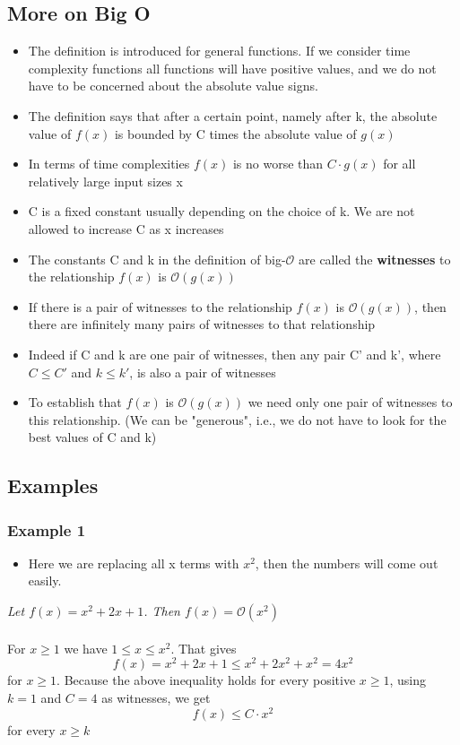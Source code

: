 \documentclass{article}[18pt]
\begin{document}
\subsection{More on Big O}
\begin{itemize}
	\item The definition is introduced for general functions. If we consider time complexity functions all functions will have positive values, and we do not have to be concerned about the absolute value signs.
	\item The definition says that after a certain point, namely after k, the absolute value of $f(x)$ is bounded by C times the absolute value of $g(x)$
	\item In terms of time complexities $f(x)$ is no worse than $C\cdot g(x)$ for all relatively large input sizes x
	\item C is a fixed constant usually depending on the choice of k. We are not allowed to increase C as x increases
	\item The constants C and k in the definition of big-$\mathcal{O}$ are called the \textbf{witnesses} to the relationship $f(x)$ is $\mathcal{O}(g(x))$
	\item If there is a pair of witnesses to the relationship $f(x)$ is $\mathcal{O}(g(x))$, then there are infinitely many pairs of witnesses to that relationship
	\item Indeed if C and k are one pair of witnesses, then any pair C' and k', where $C\leqslant C'$ and $k\leqslant k'$, is also a pair of witnesses
	\item To establish that $f(x)$ is $\mathcal{O}(g(x))$ we need only one pair of witnesses to this relationship. (We can be "generous", i.e., we do not have to look for the best values of C and k)
\end{itemize}
\subsection{Examples}
\subsubsection{Example 1}
\begin{itemize}
	\item Here we are replacing all x terms with $x^2$, then the numbers will come out easily.
\end{itemize}


\textit{Let $f(x)=x^2+2x+1$. Then $f(x)=\mathcal{O}(x^2)$ }\\
\\
For $x\geqslant 1$ we have $1\leqslant x\leqslant x^2$. That gives
$$f ( x ) = x ^ { 2 } + 2 x + 1 \leq x ^ { 2 } + 2 x ^ { 2 } + x ^ { 2 } = 4 x ^ { 2 }$$
for $x\geqslant1$. Because the above inequality holds for every positive $x\geqslant 1$, using $k=1$ and $C=4$ as witnesses, we get
$$f(x)\leqslant C\cdot x^2$$
for every $x\geqslant k$
\end{document}
